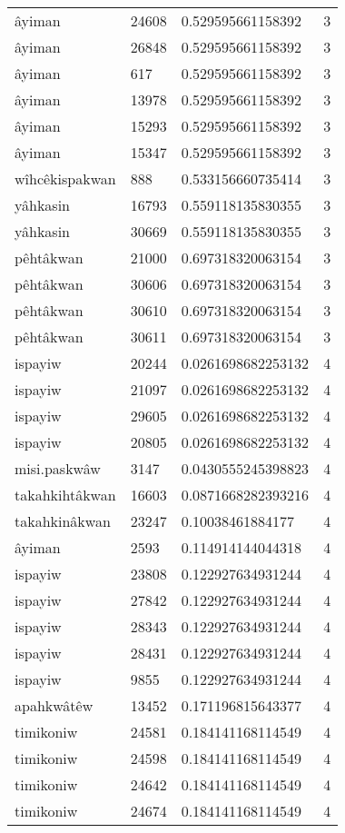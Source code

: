\begin{longtable}{llll}
âyiman & 24608 & 0.529595661158392 & 3 \\
âyiman & 26848 & 0.529595661158392 & 3 \\
âyiman & 617 & 0.529595661158392 & 3 \\
âyiman & 13978 & 0.529595661158392 & 3 \\
âyiman & 15293 & 0.529595661158392 & 3 \\
âyiman & 15347 & 0.529595661158392 & 3 \\
wîhcêkispakwan & 888 & 0.533156660735414 & 3 \\
yâhkasin & 16793 & 0.559118135830355 & 3 \\
yâhkasin & 30669 & 0.559118135830355 & 3 \\
pêhtâkwan & 21000 & 0.697318320063154 & 3 \\
pêhtâkwan & 30606 & 0.697318320063154 & 3 \\
pêhtâkwan & 30610 & 0.697318320063154 & 3 \\
pêhtâkwan & 30611 & 0.697318320063154 & 3 \\
ispayiw & 20244 & 0.0261698682253132 & 4 \\
ispayiw & 21097 & 0.0261698682253132 & 4 \\
ispayiw & 29605 & 0.0261698682253132 & 4 \\
ispayiw & 20805 & 0.0261698682253132 & 4 \\
misi.paskwâw & 3147 & 0.0430555245398823 & 4 \\
takahkihtâkwan & 16603 & 0.0871668282393216 & 4 \\
takahkinâkwan & 23247 & 0.10038461884177 & 4 \\
âyiman & 2593 & 0.114914144044318 & 4 \\
ispayiw & 23808 & 0.122927634931244 & 4 \\
ispayiw & 27842 & 0.122927634931244 & 4 \\
ispayiw & 28343 & 0.122927634931244 & 4 \\
ispayiw & 28431 & 0.122927634931244 & 4 \\
ispayiw & 9855 & 0.122927634931244 & 4 \\
apahkwâtêw & 13452 & 0.171196815643377 & 4 \\
timikoniw & 24581 & 0.184141168114549 & 4 \\
timikoniw & 24598 & 0.184141168114549 & 4 \\
timikoniw & 24642 & 0.184141168114549 & 4 \\
timikoniw & 24674 & 0.184141168114549 & 4 \\

\end{longtable}

